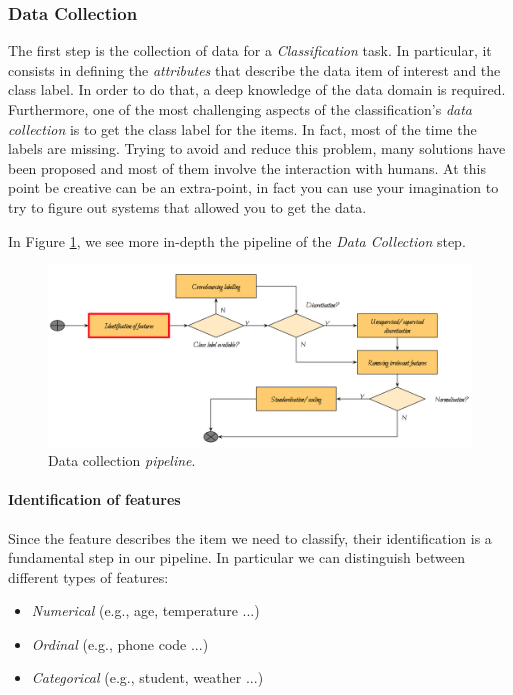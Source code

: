 \subsubsection{Data Collection}

The first step is the collection of data for a \emph{Classification} task. In particular, it consists in defining the \emph{attributes} that describe the data item of interest and the class label. In order to do that, a deep knowledge of the data domain is required. Furthermore, one of the most challenging aspects of the classification's \emph{data collection} is to get the class label for the items. In fact, most of the time the labels are missing. Trying to avoid and reduce this problem, many solutions have been proposed and most of them involve the interaction with humans. At this point be creative can be an extra-point, in fact you can use your imagination to try to figure out systems that allowed you to get the data.

In Figure \ref{pic:data_collection_pipeline}, we see more in-depth the pipeline of the \emph{Data Collection} step. 

\begin{figure}[H]%
 \centering
 \includegraphics[width=13cm]{./img/08/data_collection_pipeline}
 \caption{\label{pic:data_collection_pipeline} Data collection \emph{pipeline}.}
\end{figure}

\paragraph{Identification of features}

Since the feature describes the item we need to classify, their identification is a fundamental step in our pipeline. In particular we can distinguish between different types of features:
\begin{itemize}
\item \emph{Numerical} (e.g., age, temperature ...)
\item \emph{Ordinal} (e.g., phone code ...)
\item \emph{Categorical} (e.g., student, weather ...)
\end{itemize}


